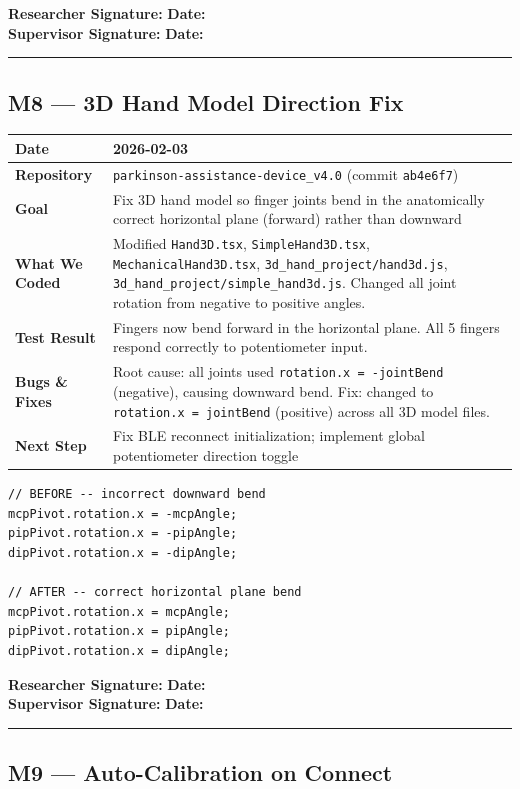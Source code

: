 \documentclass[12pt,a4paper]{article}
\makeatletter
\newcommand{\sigblock}{%
  \vspace{0.6em}
  \noindent\textbf{Researcher Signature:} \underline{\hspace{6cm}} \quad \textbf{Date:} \underline{\hspace{3cm}}\\[0.4em]
  \noindent\textbf{Supervisor Signature:} \underline{\hspace{6cm}} \quad \textbf{Date:} \underline{\hspace{3cm}}
  \vspace{0.4em}\hrule\vspace{0.6em}
}
\newenvironment{milestonetable}{%
  \begin{tcolorbox}[colback=codebg, colframe=codeframe, breakable, left=4pt, right=4pt, top=4pt, bottom=4pt]
  \begin{tabularx}{\linewidth}{@{}>{\bfseries}p{3.2cm} X@{}}
  \toprule
}{%
  \bottomrule
  \end{tabularx}
  \end{tcolorbox}
}
\newcommand{\mrow}[2]{\midrule #1 & #2 \\}
\makeatother
\begin{document}
\sigblock

\subsection{M8 --- 3D Hand Model Direction Fix}

\begin{milestonetable}
\mrow{Date}{2026-02-03}
\mrow{Repository}{\texttt{parkinson-assistance-device\_v4.0} (commit \texttt{ab4e6f7})}
\mrow{Goal}{Fix 3D hand model so finger joints bend in the anatomically correct horizontal plane (forward) rather than downward}
\mrow{What We Coded}{Modified \texttt{Hand3D.tsx}, \texttt{SimpleHand3D.tsx}, \texttt{MechanicalHand3D.tsx}, \texttt{3d\_hand\_project/hand3d.js}, \texttt{3d\_hand\_project/simple\_hand3d.js}. Changed all joint rotation from negative to positive angles.}
\mrow{Test Result}{Fingers now bend forward in the horizontal plane. All 5 fingers respond correctly to potentiometer input.}
\mrow{Bugs \& Fixes}{Root cause: all joints used \texttt{rotation.x = -jointBend} (negative), causing downward bend. Fix: changed to \texttt{rotation.x = jointBend} (positive) across all 3D model files.}
\mrow{Next Step}{Fix BLE reconnect initialization; implement global potentiometer direction toggle}
\end{milestonetable}

\begin{lstlisting}[style=tsstyle, caption={SimpleHand3D.tsx -- Joint rotation direction fix}]
// BEFORE -- incorrect downward bend
mcpPivot.rotation.x = -mcpAngle;
pipPivot.rotation.x = -pipAngle;
dipPivot.rotation.x = -dipAngle;

// AFTER -- correct horizontal plane bend
mcpPivot.rotation.x = mcpAngle;
pipPivot.rotation.x = pipAngle;
dipPivot.rotation.x = dipAngle;
\end{lstlisting}

\sigblock

\subsection{M9 --- Auto-Calibration on Connect}
\end{document}

